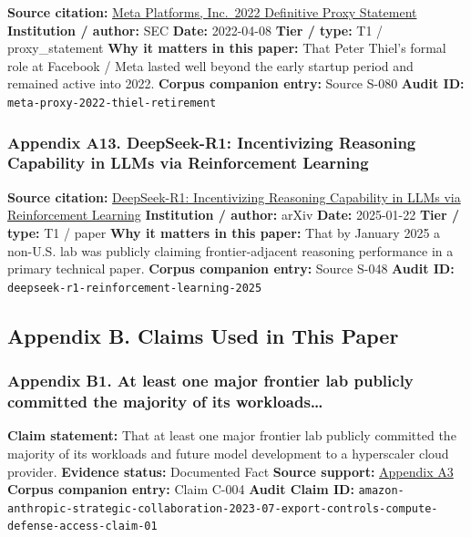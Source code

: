 \documentclass[
  american,
  11pt,
  letterpaper,
]{article}
\begin{document}
\textbf{Source citation:}
\href{https://www.sec.gov/Archives/edgar/data/1326801/000132680122000043/meta2022definitiveproxysta.htm}{Meta
Platforms, Inc.~2022 Definitive Proxy Statement} \textbf{Institution /
author:} SEC \textbf{Date:} 2022-04-08 \textbf{Tier / type:} T1 /
proxy\_statement \textbf{Why it matters in this paper:} That Peter
Thiel's formal role at Facebook / Meta lasted well beyond the early
startup period and remained active into 2022. \textbf{Corpus companion
entry:} Source S-080 \textbf{Audit ID:}
\texttt{meta-proxy-2022-thiel-retirement}

\subsubsection{Appendix A13. DeepSeek-R1: Incentivizing Reasoning
Capability in LLMs via Reinforcement
Learning}\label{appendix-a13-deepseek-r1-incentivizing-reasoning-capability-in-llms-via-reinforcement-learning}

\textbf{Source citation:}
\href{https://arxiv.org/abs/2501.12948}{DeepSeek-R1: Incentivizing
Reasoning Capability in LLMs via Reinforcement Learning}
\textbf{Institution / author:} arXiv \textbf{Date:} 2025-01-22
\textbf{Tier / type:} T1 / paper \textbf{Why it matters in this paper:}
That by January 2025 a non-U.S. lab was publicly claiming
frontier-adjacent reasoning performance in a primary technical paper.
\textbf{Corpus companion entry:} Source S-048 \textbf{Audit ID:}
\texttt{deepseek-r1-reinforcement-learning-2025}

\subsection{Appendix B. Claims Used in This
Paper}\label{appendix-b.-claims-used-in-this-paper}

\subsubsection{Appendix B1. At least one major frontier lab publicly
committed the majority of its
workloads\ldots{}}\label{appendix-b1-at-least-one-major-frontier-lab-publicly-committed-the-majority-of-its-workloads}

\textbf{Claim statement:} That at least one major frontier lab publicly
committed the majority of its workloads and future model development to
a hyperscaler cloud provider. \textbf{Evidence status:} Documented Fact
\textbf{Source support:}
\hyperref[appendix-a3-amazon-and-anthropic-announce-strategic-collaboration-to-advance-generative-ai]{Appendix
A3} \textbf{Corpus companion entry:} Claim C-004 \textbf{Audit Claim
ID:}
\texttt{amazon-anthropic-strategic-collaboration-2023-07-export-controls-compute-defense-access-claim-01}
\end{document}
